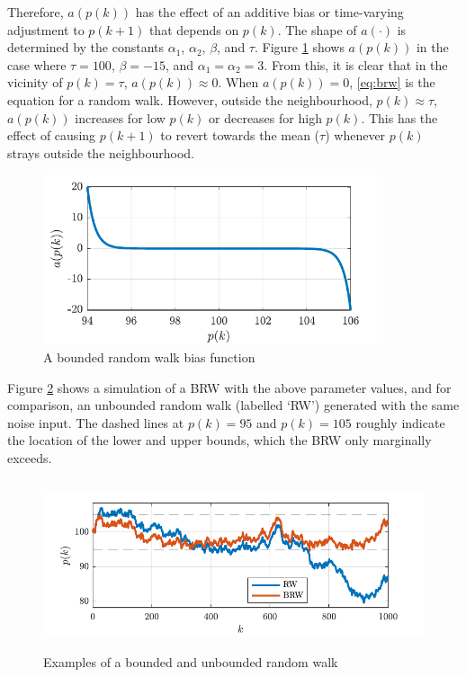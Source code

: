 Therefore, $a(p(k))$ has the effect of an additive bias or time-varying adjustment to $p(k+1)$ that depends on $p(k)$. The shape of $a(\cdot)$ is determined by the constants $\alpha_{1}$,  $\alpha_{2}$, $\beta$, and $\tau$. Figure \ref{fig:brw-a} shows $a(p(k))$ in the case where $\tau=100$, $\beta=-15$, and $\alpha_{1}=\alpha_{2}=3$.  From this, it is clear that in the vicinity of $p(k)=\tau$, $a(p(k))\approx0$. When $a(p(k))=0$, \eqref{eq:brw} is the equation for a random walk. However, outside the neighbourhood, $p(k) \approx \tau$, $a(p(k))$ increases for low $p(k)$ or decreases for high $p(k)$. This has the effect of causing $p(k+1)$ to revert towards the mean ($\tau$) whenever $p(k)$ strays outside the neighbourhood. 
\begin{figure}[ht]
	\centering
	\includegraphics[height=5cm]{images/brw_a.pdf}
	\caption{A bounded random walk bias function}
	\label{fig:brw-a}
\end{figure}

Figure \ref{fig:brw-sim} shows a simulation of a \gls{BRW} with the above parameter values, and for comparison, an unbounded random walk (labelled `RW') generated with the same noise input. The dashed lines at $p(k)=95$ and $p(k)=105$ roughly indicate the location of the lower and upper bounds, which the \gls{BRW} only marginally exceeds.
\begin{figure}[ht]
	\centering
	\includegraphics[height=5cm]{images/brw_sim.pdf}
	\caption{Examples of a bounded and unbounded random walk}
	\label{fig:brw-sim}
\end{figure}

